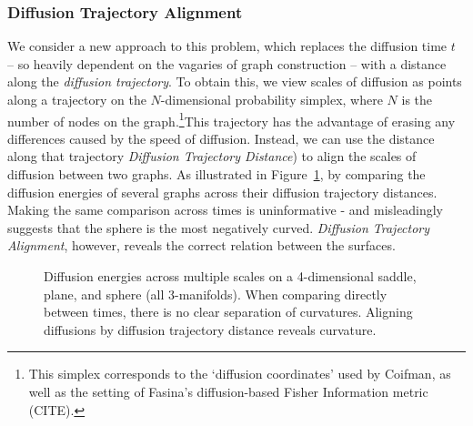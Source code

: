\documentclass[
  letterpaper,
  DIV=11,
  numbers=noendperiod]{scrartcl}
\theoremstyle{plain}
\theoremstyle{definition}
\theoremstyle{plain}
\theoremstyle{definition}
\theoremstyle{plain}
\theoremstyle{remark}
\begin{document}
\subsubsection{Diffusion Trajectory
Alignment}\label{diffusion-trajectory-alignment}

We consider a new approach to this problem, which replaces the diffusion
time \(t\) -- so heavily dependent on the vagaries of graph construction
-- with a distance along the \emph{diffusion trajectory}. To obtain
this, we view scales of diffusion as points along a trajectory on the
\(N\)-dimensional probability simplex, where \(N\) is the number of
nodes on the graph.\footnote{This simplex corresponds to the `diffusion
  coordinates' used by Coifman, as well as the setting of Fasina's
  diffusion-based Fisher Information metric (CITE).}This trajectory has
the advantage of erasing any differences caused by the speed of
diffusion. Instead, we can use the distance along that trajectory
\emph{Diffusion Trajectory Distance}) to align the scales of diffusion
between two graphs. As illustrated in Figure~\ref{fig-curvature-curves},
by comparing the diffusion energies of several graphs across their
diffusion trajectory distances. Making the same comparison across times
is uninformative - and misleadingly suggests that the sphere is the most
negatively curved. \emph{Diffusion Trajectory Alignment}, however,
reveals the correct relation between the surfaces.

\begin{figure}[H]


\caption{\label{fig-curvature-curves}Diffusion energies across multiple
scales on a 4-dimensional saddle, plane, and sphere (all 3-manifolds).
When comparing directly between times, there is no clear separation of
curvatures. Aligning diffusions by diffusion trajectory distance reveals
curvature.}

\end{figure}%
\end{document}
